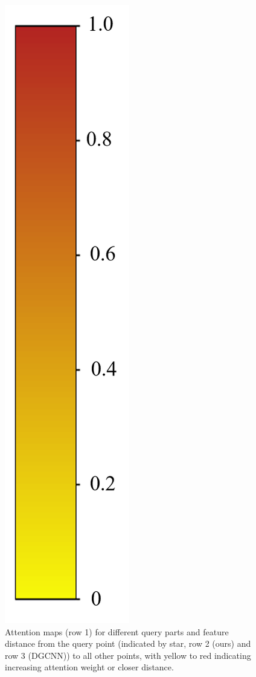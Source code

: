 \documentclass[letterpaper]{article} %
\begin{document}
\begin{figure}[htbp]
\begin{center}
\begin{minipage}[b]{0.04\linewidth}
\begin{center}
\includegraphics[width=1.0\linewidth]{images/atten_pic/color_bar.png}
\end{center}
\end{minipage}
\end{center}
\caption{Attention maps (row 1) for different query parts and feature distance from the query point (indicated by star, row 2 (ours) and row 3 (DGCNN)) to all other points, with yellow to red indicating increasing attention weight or closer distance.}
\label{fig:feature_vis}
\end{figure}
\end{document}
